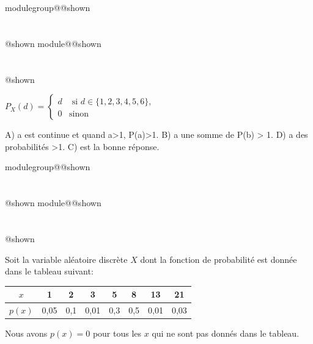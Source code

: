 \documentclass{Evaluation}
\makeatletter
\newcommand{\currentmodulekey}{}
\newcommand{\currentmoduletitle}{}
\newcommand{\currentgroupkey}{}
\newcommand{\currentgrouptitle}{}
\newcommand{\showmoduleifneeded}{%
  \ifx\currentgroupkey\empty\else
    \expandafter\ifx\csname modulegroup@\currentgroupkey @shown\endcsname\relax
      \section*{\currentgrouptitle}%
      \expandafter\gdef\csname modulegroup@\currentgroupkey @shown\endcsname{1}%
    \fi
  \fi
  \expandafter\ifx\csname module@\currentmodulekey @shown\endcsname\relax
    \section*{\currentmoduletitle}%
    \expandafter\gdef\csname module@\currentmodulekey @shown\endcsname{1}%
  \fi
}
\newenvironment{A22}{\showmoduleifneeded}{}
\newenvironment{A25}{\showmoduleifneeded}{}
\makeatother
\begin{document}
\begin{questions}
\begin{A22}
\begin{checkboxes}
\choice $P_X(d)=\left\{
\begin{array}{ll}
d  & \mbox{ si } d\in \{1,2,3,4,5,6\}, \\
0 & \mbox{sinon}
\end{array}
\right.$
\end{checkboxes}

\begin{solution}
A) a est continue et quand a>1, P(a)>1. B) a une somme de P(b) > 1. D) a des probabilités >1. C) est la bonne réponse.
\end{solution}
\end{A22}

\begin{A25}
\question {} %
Soit la variable aléatoire discrète $X$ dont la fonction de probabilité est donnée dans le tableau suivant:

\begin{table}[h]
    \centering
        \begingroup
\setlength{\tabcolsep}{10pt}    
\renewcommand{\arraystretch}{1.5}
    \begin{tabular}{|c|c|c|c|c|c|c|c|}
    \hline
        $x$ & 1 & 2 & 3 & 5 & 8 & 13 & 21  \\
        \hline
        $p(x)$ & 0,05 & 0,1 & 0,01 & 0,3 & 0,5 & 0,01 &0,03\\
        \hline
    \end{tabular}
    \endgroup
    \end{table}
Nous avons $p(x)=0$ pour tous les $x$ qui ne sont pas donnés dans le tableau.

\end{A25}
\end{questions}
\end{document}
